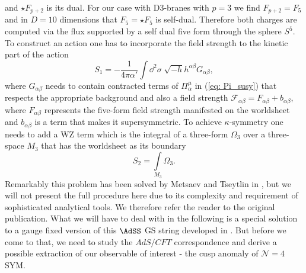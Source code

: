%
%
and $\star F_{p+2}$ is its  dual. For our case with D3-branes with $p=3$ we find $F_{p+2}=F_{5}$ and in $D=10$ dimensions that $F_{5}=\star F_{5}$ is self-dual. Therefore both charges are computed via the flux supported by a self dual five form through the sphere $S^{5}$. To construct an action one has to incorporate the field strength to the kinetic part of the action 
%
%
\begin{equation}
S_{1} = -\frac{1}{4\pi \alpha'} \int \dd^{2}\sigma\; \sqrt{-h}h^{\alpha\beta} G_{\alpha\beta},
\end{equation}
%
%
where $G_{\alpha\beta}$ needs to contain contracted terms of $\Pi^{\mu}_{\alpha}$ in (\ref{eq: Pi_susy}) that respects the appropriate background and also a field strength $\mathcal{F}_{\alpha\beta} = F_{\alpha\beta}+b_{\alpha\beta}$, where $F_{\alpha\beta}$ represents the five-form field strength manifested on the worldsheet and $b_{\alpha\beta}$ is a term that makes it supersymmetric. To achieve $\kappa$-symmetry one needs to add a WZ term which is the integral of a three-form $\Omega_{3}$ over a three-space $M_{3}$ that has the worldsheet as its boundary
%
%
\begin{equation}
S_{2} = \int\limits_{M_{3}} \Omega_{3}.
\end{equation}
%
%
Remarkably this problem has been solved by Metsaev and Tseytlin in \cite{Metsaev:1998it}, but we will not present the full procedure here due to its complexity and requirement of sophisticated analytical tools. We therefore refer the reader to the original publication. What we will have to deal with in the following is a special solution to a gauge fixed version of this $\AdSS$ GS string developed in \cite{Metsaev:1998it}. But before we come to that, we need to study the $AdS/CFT$ correspondence and derive a possible extraction of our observable of interest - the cusp anomaly of $\mathcal{N}=4$ SYM. 
